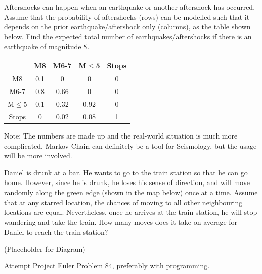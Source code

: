 \begin{Exercise}
Aftershocks can happen when an earthquake or another aftershock has occurred. Assume that the probability of aftershocks (rows) can be modelled such that it depends on the prior earthquake/aftershock only (columns), as the table shown below. Find the expected total number of earthquakes/aftershocks if there is an earthquake of magnitude 8.
\begin{center}
\begin{tabular}{|c|c|c|c|c|}
\hline
& M8 & M6-7 & M$\leq$5 & Stops\\
\hline
M8 & 0.1 & 0 & 0 & 0\\
\hline
M6-7 & 0.8 & 0.66 & 0 & 0\\
\hline
M$\leq$5 & 0.1 & 0.32 & 0.92 & 0\\
\hline
Stops & 0 & 0.02 & 0.08 & 1\\
\hline
\end{tabular}
\end{center}
Note: The numbers are made up and the real-world situation is much more complicated. Markov Chain can definitely be a tool for Seismology, but the usage will be more involved.
\end{Exercise}

\begin{Exercise}
Daniel is drunk at a bar. He wants to go to the train station so that he can go home. However, since he is drunk, he loses his sense of direction, and will move randomly along the green edge (shown in the map below) once at a time. Assume that at any starred location, the chances of moving to all other neighbouring locations are equal. Nevertheless, once he arrives at the train station, he will stop wandering and take the train. How many moves does it take on average for Daniel to reach the train station?
\begin{center}
(Placeholder for Diagram)
\end{center}
\end{Exercise}

\begin{Exercise}
Attempt \href{https://projecteuler.net/problem=84}{Project Euler Problem 84}, preferably with programming.
\end{Exercise}